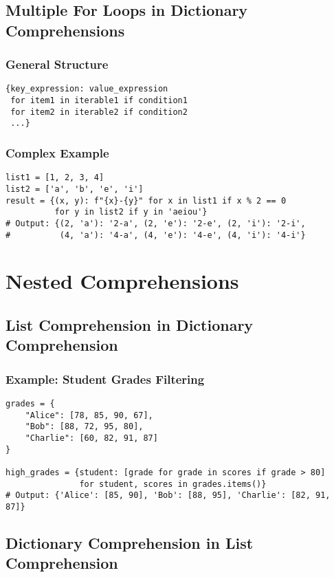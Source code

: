 \documentclass[12pt,a4paper]{article}
\begin{document}
\subsection{Multiple For Loops in Dictionary Comprehensions}

\subsubsection{General Structure}
\begin{lstlisting}
{key_expression: value_expression
 for item1 in iterable1 if condition1
 for item2 in iterable2 if condition2
 ...}
\end{lstlisting}

\subsubsection{Complex Example}
\begin{lstlisting}
list1 = [1, 2, 3, 4]
list2 = ['a', 'b', 'e', 'i']
result = {(x, y): f"{x}-{y}" for x in list1 if x % 2 == 0 
          for y in list2 if y in 'aeiou'}
# Output: {(2, 'a'): '2-a', (2, 'e'): '2-e', (2, 'i'): '2-i', 
#          (4, 'a'): '4-a', (4, 'e'): '4-e', (4, 'i'): '4-i'}
\end{lstlisting}

\section{Nested Comprehensions}

\subsection{List Comprehension in Dictionary Comprehension}

\subsubsection{Example: Student Grades Filtering}
\begin{lstlisting}
grades = {
    "Alice": [78, 85, 90, 67],
    "Bob": [88, 72, 95, 80],
    "Charlie": [60, 82, 91, 87]
}

high_grades = {student: [grade for grade in scores if grade > 80] 
               for student, scores in grades.items()}
# Output: {'Alice': [85, 90], 'Bob': [88, 95], 'Charlie': [82, 91, 87]}
\end{lstlisting}

\subsection{Dictionary Comprehension in List Comprehension}
\end{document}
